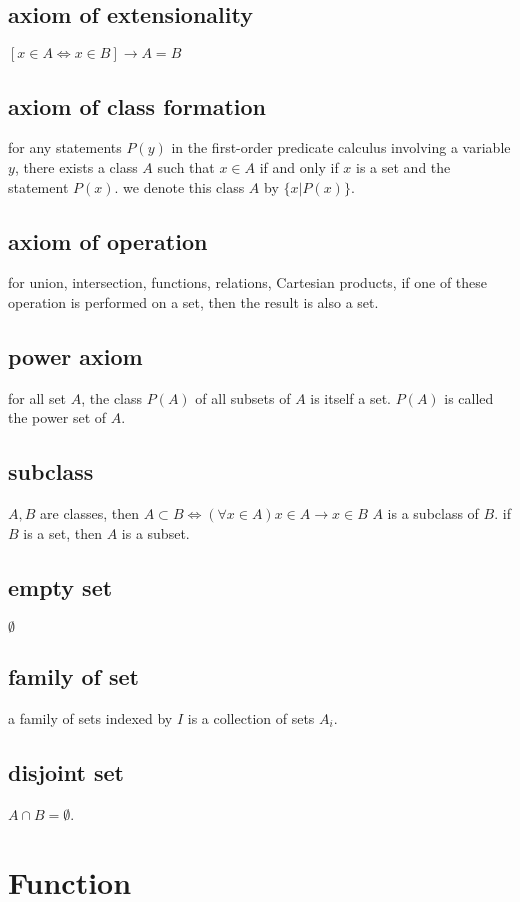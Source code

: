 \documentclass[11pt]{article}
\begin{document}
\subsection{axiom of extensionality}
\label{sec:orgb264a82}
\([x\in A \iff x\in B] \to A = B\)
\subsection{axiom of class formation}
\label{sec:orga05c58e}
for any statements \(P(y)\) in the first-order predicate calculus
involving a variable \(y\), there exists a class \(A\) such that 
\(x\in A\) if and only if \(x\) is a set and the statement \(P(x)\).
we denote this class \(A\) by \(\{x|P(x)\}\).
\subsection{axiom of operation}
\label{sec:org982b54f}
for union, intersection, functions, relations, Cartesian products,
if one of these operation is performed on a set, then the result 
is also a set.
\subsection{power axiom}
\label{sec:org439aa1b}
for all set \(A\), the class \(P(A)\) of all subsets of \(A\) is itself a set.
\(P(A)\) is called the power set of \(A\).
\subsection{subclass}
\label{sec:orgb1ad5e8}
\(A, B\) are classes, then
\(A\subset B \iff (\forall x\in A) x\in A \to x\in B\)
\(A\) is a subclass of \(B\).
if \(B\) is a set, then \(A\) is a subset.
\subsection{empty set}
\label{sec:org8799a62}
\(\emptyset\)
\subsection{family of set}
\label{sec:orgdfa6280}
a family of sets indexed by \(I\) is a collection of sets \(A_i\).
\subsection{disjoint set}
\label{sec:org8dbd230}
\(A\cap B = \emptyset\).

\section{Function}
\label{sec:org6375733}
\end{document}
